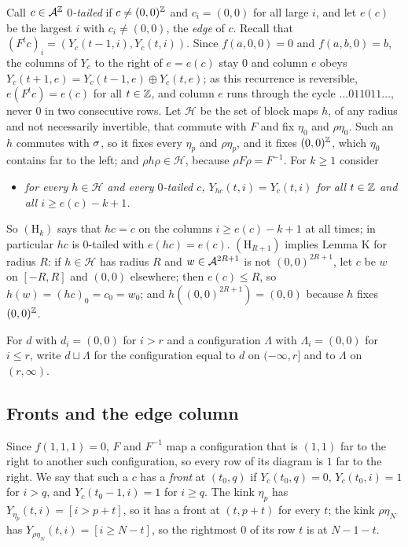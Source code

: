 Call $c\in\mathcal{A}^{\mathbb{Z}}$ \emph{$0$-tailed} if $c\ne(0,0)^{\mathbb{Z}}$ and $c_i=(0,0)$ for all large $i$, and let $e(c)$ be the largest $i$ with $c_i\ne(0,0)$, the \emph{edge} of $c$. Recall that $(F^tc)_i=(Y_c(t-1,i),Y_c(t,i))$. Since $f(a,0,0)=0$ and $f(a,b,0)=b$, the columns of $Y_c$ to the right of $e=e(c)$ stay $0$ and column $e$ obeys $Y_c(t+1,e)=Y_c(t-1,e)\oplus Y_c(t,e)$; as this recurrence is reversible, $e(F^tc)=e(c)$ for all $t\in\mathbb{Z}$, and column $e$ runs through the cycle $\dots011011\dots$, never $0$ in two consecutive rows. Let $\mathcal H$ be the set of block maps $h$, of any radius and not necessarily invertible, that commute with $F$ and fix $\eta_0$ and $\rho\eta_0$. Such an $h$ commutes with $\sigma$, so it fixes every $\eta_p$ and $\rho\eta_p$, and it fixes $(0,0)^{\mathbb{Z}}$, which $\eta_0$ contains far to the left; and $\rho h\rho\in\mathcal H$, because $\rho F\rho=F^{-1}$. For $k\ge1$ consider
\begin{itemize}
\item[$(\mathrm H_k)$] \emph{for every $h\in\mathcal H$ and every $0$-tailed $c$, $Y_{hc}(t,i)=Y_c(t,i)$ for all $t\in\mathbb{Z}$ and all $i\ge e(c)-k+1$.}
\end{itemize}
So $(\mathrm H_k)$ says that $hc=c$ on the columns $i\ge e(c)-k+1$ at all times; in particular $hc$ is $0$-tailed with $e(hc)=e(c)$. $(\mathrm H_{R+1})$ implies Lemma K for radius $R$: if $h\in\mathcal H$ has radius $R$ and $w\in\mathcal{A}^{2R+1}$ is not $(0,0)^{2R+1}$, let $c$ be $w$ on $[-R,R]$ and $(0,0)$ elsewhere; then $e(c)\le R$, so $h(w)=(hc)_0=c_0=w_0$; and $h((0,0)^{2R+1})=(0,0)$ because $h$ fixes $(0,0)^{\mathbb{Z}}$.

For $d$ with $d_i=(0,0)$ for $i>r$ and a configuration $\Lambda$ with $\Lambda_i=(0,0)$ for $i\le r$, write $d\sqcup\Lambda$ for the configuration equal to $d$ on $(-\infty,r]$ and to $\Lambda$ on $(r,\infty)$.

\subsection{Fronts and the edge column}\label{cl:sec:fronts}

Since $f(1,1,1)=0$, $F$ and $F^{-1}$ map a configuration that is $(1,1)$ far to the right to another such configuration, so every row of its diagram is $1$ far to the right. We say that such a $c$ has a \emph{front} at $(t_0,q)$ if $Y_c(t_0,q)=0$, $Y_c(t_0,i)=1$ for $i>q$, and $Y_c(t_0-1,i)=1$ for $i\ge q$. The kink $\eta_p$ has $Y_{\eta_p}(t,i)=[i>p+t]$, so it has a front at $(t,p+t)$ for every $t$; the kink $\rho\eta_N$ has $Y_{\rho\eta_N}(t,i)=[i\ge N-t]$, so the rightmost $0$ of its row $t$ is at $N-1-t$.

